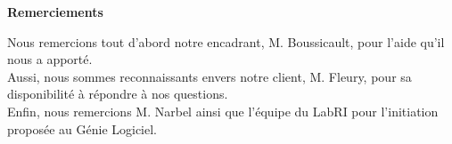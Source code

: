 \begin{titlepage}
\begin{center}
\vspace{5cm}
{\bf {\large Remerciements}} \vspace{3cm}\\
\end{center}
Nous remercions tout d'abord notre encadrant, M. Boussicault, pour l'aide qu'il nous a apporté. \\
Aussi, nous sommes reconnaissants envers notre client, M. Fleury, pour sa disponibilité à répondre à nos questions. \\
Enfin, nous remercions M. Narbel ainsi que l'équipe du LabRI pour l'initiation proposée au Génie Logiciel.


\end{titlepage}
